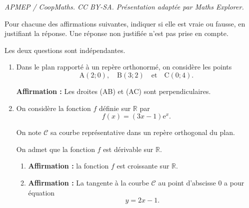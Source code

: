 \documentclass[10pt]{article}
\providecommand{\R}{\mathbb{R}}
\providecommand{\e}{{\mathrm{e}}}
\begin{document}
\noindent\textit{APMEP / CoopMaths. CC BY-SA. Présentation adaptée par Maths Explorer.}\par\medskip
Pour chacune des affirmations suivantes, indiquer si elle est vraie ou fausse, en justifiant la réponse. Une réponse non justifiée n'est pas prise en compte.

Les deux questions sont indépendantes.

\begin{enumerate}
	\item Dans le plan rapporté à un repère orthonormé, on considère les points
	\[\mathrm{A}(2 ; 0), \quad \mathrm{B}(3 ; 2) \quad \text{et} \quad \mathrm{C}(0 ; 4).\]

	\textbf{Affirmation :} Les droites (AB) et (AC) sont perpendiculaires.

	\item On considère la fonction $f$ définie sur $\R$ par
	\[f(x) = (3x - 1)\e^x.\]

	On note $\mathcal{C}$ sa courbe représentative dans un repère orthogonal du plan.

	On admet que la fonction $f$ est dérivable sur $\R$.

	\begin{enumerate}
		\item \textbf{Affirmation :} la fonction $f$ est croissante sur $\R$.
		\item \textbf{Affirmation :} La tangente à la courbe $\mathcal{C}$ au point d'abscisse $0$ a pour équation
		\[y = 2x - 1.\]
	\end{enumerate}
	\end{enumerate}
\end{document}
